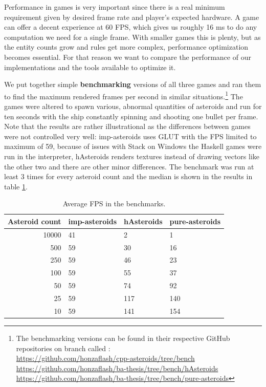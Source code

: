 \documentclass[
  digital, %
  color,   %
  table,   %
  oneside, %
  lof,     %
  lot,     %
]{fithesis3}
\begin{document}
{Performance in games is very important since there is a real minimum requirement
given by desired frame rate and player's expected hardware. A game can offer
a decent experience at 60 FPS, which gives us roughly 16 ms to do any computation
we need for a single frame. With smaller games this is plenty, but as the entity
counts grow and rules get more complex, performance optimization becomes essential.
For that reason we want to compare the performance of our implementations and
the tools available to optimize it.

We put together simple \textbf{benchmarking} versions of all three games and ran them
to find the maximum rendered frames per second in similar situations.\footnote{
The benchmarking versions can be found in their respective GitHub repositories
on branch called :\\
\url{https://github.com/honzaflash/cpp-asteroids/tree/bench}\\
\url{https://github.com/honzaflash/ba-thesis/tree/bench/hAsteroids}\\
\url{https://github.com/honzaflash/ba-thesis/tree/bench/pure-asteroids}
}
The games were altered to spawn various, abnormal quantities of asteroids and
run for ten seconds with the ship constantly spinning and shooting one bullet per frame.
Note that the results are rather illustrational as the differences between games were not controlled
very well: imp-asteroids uses GLUT with the FPS limited to maximum of 59, because of issues
with Stack on Windows the Haskell games were run in the interpreter, hAsteroids renders
textures instead of drawing vectors like the other two and there are other minor differences.
The benchmark was run at least 3 times for every asteroid count and the median is shown
in the results in table \ref{tab:benchfps}.

\begin{table}
  \begin{tabularx}{\textwidth}{|r|llX|}
    \toprule
    Asteroid count & \textbf{imp-asteroids} & \textbf{hAsteroids} & \textbf{pure-asteroids} \\
    \midrule
    10000 & 41 & 2   & 1   \\
    500   & 59 & 30  & 16    \\
    250   & 59 & 46  & 23    \\
    100   & 59 & 55  & 37 \\
    50    & 59 & 74  & 92 \\
    25    & 59 & 117 & 140 \\
    10    & 59 & 141 & 154 \\
    \bottomrule
  \end{tabularx}
  \caption{Average FPS in the benchmarks.}
  \label{tab:benchfps}
\end{table}

}
\end{document}
